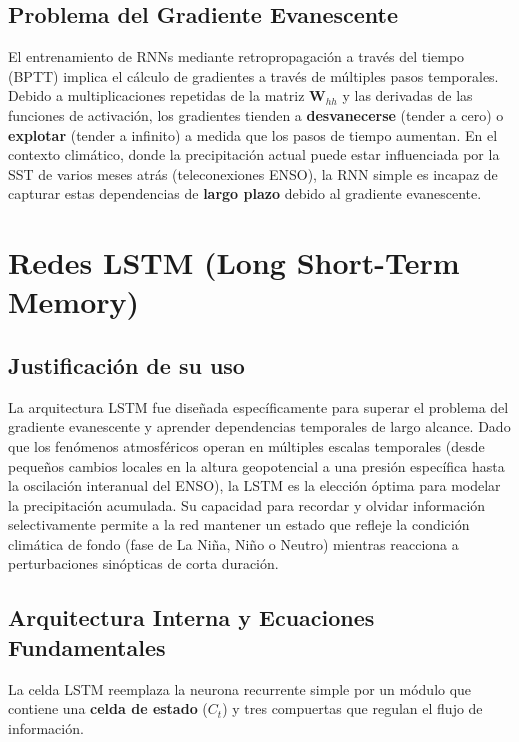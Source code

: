 \subsection{Problema del Gradiente Evanescente}
El entrenamiento de RNNs mediante retropropagación a través del tiempo (BPTT) implica el cálculo de gradientes a través de múltiples pasos temporales. Debido a multiplicaciones repetidas de la matriz \(\mathbf{W}_{hh}\) y las derivadas de las funciones de activación, los gradientes tienden a \textbf{desvanecerse} (tender a cero) o \textbf{explotar} (tender a infinito) a medida que los pasos de tiempo aumentan. En el contexto climático, donde la precipitación actual puede estar influenciada por la SST de varios meses atrás (teleconexiones ENSO), la RNN simple es incapaz de capturar estas dependencias de \textbf{largo plazo} debido al gradiente evanescente.

\section{Redes LSTM (Long Short-Term Memory)}

\subsection{Justificación de su uso}
La arquitectura LSTM fue diseñada específicamente para superar el problema del gradiente evanescente y aprender dependencias temporales de largo alcance. Dado que los fenómenos atmosféricos operan en múltiples escalas temporales (desde pequeños cambios locales en la altura geopotencial a una presión específica hasta la oscilación interanual del ENSO), la LSTM es la elección óptima para modelar la precipitación acumulada. Su capacidad para recordar y olvidar información selectivamente permite a la red mantener un estado que refleje la condición climática de fondo (fase de La Niña, Niño o Neutro) mientras reacciona a perturbaciones sinópticas de corta duración.

\subsection{Arquitectura Interna y Ecuaciones Fundamentales}
La celda LSTM reemplaza la neurona recurrente simple por un módulo que contiene una \textbf{celda de estado} (\(C_t\)) y tres compuertas que regulan el flujo de información.

